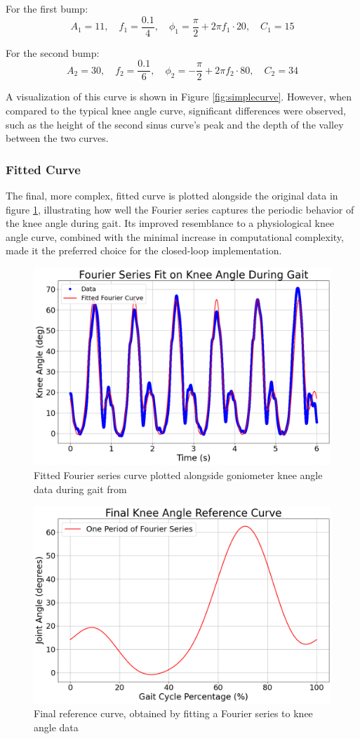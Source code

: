 For the first bump:
\[
A_1 = 11, \quad f_1 = \frac{0.1}{4}, \quad \phi_1 = \frac{\pi}{2} + 2\pi f_1 \cdot 20, \quad C_1 = 15
\]

For the second bump:
\[
A_2 = 30, \quad f_2 = \frac{0.1}{6}, \quad \phi_2 = -\frac{\pi}{2} + 2\pi f_2 \cdot 80, \quad C_2 = 34
\]


A visualization of this curve is shown in Figure \ref{fig:simplecurve}. However, when compared to the typical knee angle curve, significant differences were observed, such as the height of the second sinus curve's peak and the depth of the valley between the two curves.


\subsubsection{Fitted Curve}
The final, more complex, fitted curve is plotted alongside the original data in figure \ref{fig:kneeangleref}, illustrating how well the Fourier series captures the periodic behavior of the knee angle during gait. Its improved resemblance to a physiological knee angle curve, combined with the minimal increase in computational complexity, made it the preferred choice for the closed-loop implementation.
\begin{figure} [H]
    \centering
    \includegraphics[width=0.85\linewidth]{images/bigfittedcurve.png}
    \caption{Fitted Fourier series curve plotted alongside goniometer knee angle data during gait from \cite{camargo_comprehensive_2021}}
    \label{fig:kneeangleref}
\end{figure}
\begin{figure} [H]
    \centering
    \includegraphics[width=0.75\linewidth]{images/bigfinalref.png}
    \caption{Final reference curve, obtained by fitting a Fourier series to knee angle data}
    \label{fig:enter-label}
\end{figure}


